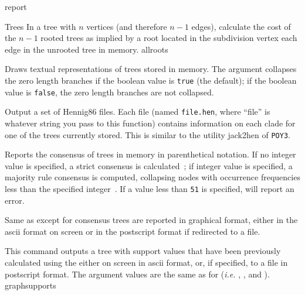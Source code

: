 \begin{command}{report}{}
\begin{arguments}
\begin{argumentgroup}{Trees}
                {In a tree with $n$ vertices (and therefore $n - 1$ edges),
                calculate the cost of the $n - 1$ rooted trees as implied by a
                root located in the subdivision vertex each edge in the unrooted
                tree in memory.}
                {allroots}

                {Draws textual representations of trees stored in memory. The
                argument  collapses the zero length branches if
                the boolean value is \texttt{true} (the default); if the boolean value is
                \texttt{false}, the zero length branches are not collapsed.}
				{}

	     {Output a set of Hennig86 files. Each file (named \texttt{file.hen},
                where ``file'' is whatever string you pass to this function)
                contains information on each clade for one of the trees
                currently stored. This is similar to the utility jack2hen 
                of \texttt{POY3}.}
				{}

                {Reports the consensus of trees in memory in parenthetical notation.
                If no integer value is
                specified, a strict consensus is calculated~\cite{rohlf1982};
                if integer value is specified,
                a majority rule consensus is computed, collapsing nodes with
                occurrence frequencies less than the specified integer~\cite{margush1981}.
                If a value less
                than \texttt{51} is specified, \poy will report an error.} 
                {}

                {Same as  except for consensus trees are
                reported in graphical format, either in the ascii format on
                screen or in the postscript format if redirected to a file.}
                {}

                {This command outputs a tree with support values that have
                been previously calculated using the
                 either on screen
                in ascii format, or, if specified, to a file in postscript
                format. The argument values are the same as for 
                 (\emph{i.e.} ,
                , and ).} 
                {graphsupports}


\end{argumentgroup}
\end{arguments}
\end{command}
